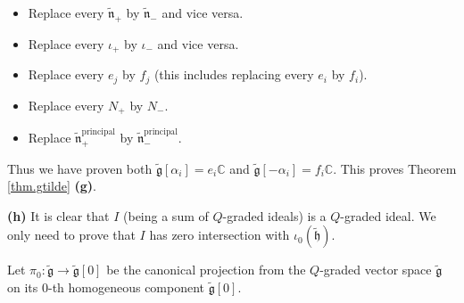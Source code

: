 \documentclass[etingof-lie.tex]{subfiles}
\begin{document}
\begin{verlong}
\begin{itemize}
\item Replace every $\widetilde{\mathfrak{n}}_{+}$ by $\widetilde{\mathfrak{n}%
}_{-}$ and vice versa.

\item Replace every $\iota_{+}$ by $\iota_{-}$ and vice versa.

\item Replace every $e_{j}$ by $f_{j}$ (this includes replacing every $e_{i}$
by $f_{i}$).

\item Replace every $N_{+}$ by $N_{-}$.

\item Replace $\widetilde{\mathfrak{n}}_{+}^{\operatorname*{principal}}$ by
$\widetilde{\mathfrak{n}}_{-}^{\operatorname*{principal}}$.
\end{itemize}

Thus we have proven both $\widetilde{\mathfrak{g}}\left[  \alpha_{i}\right]
=e_{i}\mathbb{C}$ and $\widetilde{\mathfrak{g}}\left[  -\alpha_{i}\right]
=f_{i}\mathbb{C}$. This proves Theorem \ref{thm.gtilde} \textbf{(g)}.
\end{verlong}

\bigskip

\textbf{(h)} It is clear that $I$ (being a sum of $Q$-graded ideals) is a
$Q$-graded ideal. We only need to prove that $I$ has zero intersection with
$\iota_{0}\left(  \widetilde{\mathfrak{h}}\right)  $.

Let $\pi_{0}:\widetilde{\mathfrak{g}}\rightarrow\widetilde{\mathfrak{g}%
}\left[  0\right]  $ be the canonical projection from the $Q$-graded vector
space $\widetilde{\mathfrak{g}}$ on its $0$-th homogeneous component
$\widetilde{\mathfrak{g}}\left[  0\right]  $.
\end{document}
